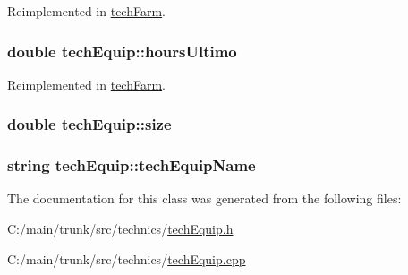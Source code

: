 Reimplemented in \hyperlink{classtech_farm_a7b246e44d0bb53d7a27544dc8f90f894}{techFarm}.\hypertarget{classtech_equip_a33c806f6d44641789a8e919ed46e8608}{
\subsubsection[{hoursUltimo}]{\setlength{\rightskip}{0pt plus 5cm}double {\bf techEquip::hoursUltimo}}}
\label{classtech_equip_a33c806f6d44641789a8e919ed46e8608}


Reimplemented in \hyperlink{classtech_farm_addd00177637ae6a4d7b2b5b17d8165eb}{techFarm}.\hypertarget{classtech_equip_a8e2d6b0d654ef641aa2bae722a926850}{
\subsubsection[{size}]{\setlength{\rightskip}{0pt plus 5cm}double {\bf techEquip::size}}}
\label{classtech_equip_a8e2d6b0d654ef641aa2bae722a926850}
\hypertarget{classtech_equip_a70f29db43df0085f1a5b8322c70e09ac}{
\subsubsection[{techEquipName}]{\setlength{\rightskip}{0pt plus 5cm}string {\bf techEquip::techEquipName}}}
\label{classtech_equip_a70f29db43df0085f1a5b8322c70e09ac}


The documentation for this class was generated from the following files:\begin{DoxyCompactItemize}
\item 
C:/main/trunk/src/technics/\hyperlink{tech_equip_8h}{techEquip.h}\item 
C:/main/trunk/src/technics/\hyperlink{tech_equip_8cpp}{techEquip.cpp}\end{DoxyCompactItemize}

